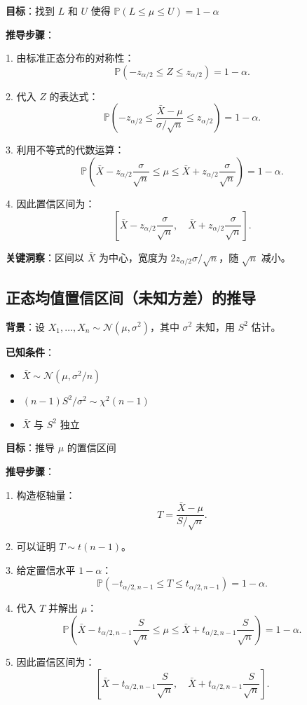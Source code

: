 \textbf{目标}：找到 $L$ 和 $U$ 使得 $\mathbb{P}(L \leq \mu \leq U) = 1-\alpha$

\textbf{推导步骤}：

1. 由标准正态分布的对称性：
\[
\mathbb{P}\left(-z_{\alpha/2} \leq Z \leq z_{\alpha/2}\right) = 1-\alpha.
\]

2. 代入 $Z$ 的表达式：
\[
\mathbb{P}\left(-z_{\alpha/2} \leq \frac{\bar{X} - \mu}{\sigma/\sqrt{n}} \leq z_{\alpha/2}\right) = 1-\alpha.
\]

3. 利用不等式的代数运算：
\[
\mathbb{P}\left(\bar{X} - z_{\alpha/2}\frac{\sigma}{\sqrt{n}} \leq \mu \leq \bar{X} + z_{\alpha/2}\frac{\sigma}{\sqrt{n}}\right) = 1-\alpha.
\]

4. 因此置信区间为：
\[
\left[ \bar{X} - z_{\alpha/2}\frac{\sigma}{\sqrt{n}}, \quad \bar{X} + z_{\alpha/2}\frac{\sigma}{\sqrt{n}} \right].
\]

\textbf{关键洞察}：区间以 $\bar{X}$ 为中心，宽度为 $2z_{\alpha/2}\sigma/\sqrt{n}$，随 $\sqrt{n}$ 减小。

\subsection{正态均值置信区间（未知方差）的推导}\label{sec:derivation-normal-ci-unknown}

\textbf{背景}：设 $X_1, \ldots, X_n \sim \mathcal{N}(\mu, \sigma^2)$，其中 $\sigma^2$ 未知，用 $S^2$ 估计。

\textbf{已知条件}：
\begin{itemize}
\item $\bar{X} \sim \mathcal{N}(\mu, \sigma^2/n)$
\item $(n-1)S^2/\sigma^2 \sim \chi^2(n-1)$
\item $\bar{X}$ 与 $S^2$ 独立
\end{itemize}

\textbf{目标}：推导 $\mu$ 的置信区间

\textbf{推导步骤}：

1. 构造枢轴量：
\[
T = \frac{\bar{X} - \mu}{S/\sqrt{n}}.
\]

2. 可以证明 $T \sim t(n-1)$。

3. 给定置信水平 $1-\alpha$：
\[
\mathbb{P}\left(-t_{\alpha/2,n-1} \leq T \leq t_{\alpha/2,n-1}\right) = 1-\alpha.
\]

4. 代入 $T$ 并解出 $\mu$：
\[
\mathbb{P}\left(\bar{X} - t_{\alpha/2,n-1}\frac{S}{\sqrt{n}} \leq \mu \leq \bar{X} + t_{\alpha/2,n-1}\frac{S}{\sqrt{n}}\right) = 1-\alpha.
\]

5. 因此置信区间为：
\[
\left[ \bar{X} - t_{\alpha/2,n-1}\frac{S}{\sqrt{n}}, \quad \bar{X} + t_{\alpha/2,n-1}\frac{S}{\sqrt{n}} \right].
\]

